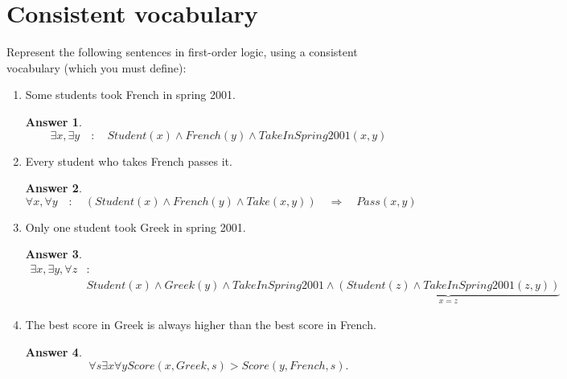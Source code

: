 \documentclass[a4paper]{article}
\renewcommand{\(}{\left(}
\renewcommand{\)}{\right)}
\theoremstyle{plain}
\theoremstyle{plain}
\theoremstyle{definition}
\newtheorem*{answer}{Answer}
\begin{document}
\section{Consistent vocabulary}
Represent the following sentences in first-order logic, using a consistent vocabulary (which you must define):
\begin{enumerate}[label*=\alph*.,ref=\alph*]
\item Some students took French in spring 2001.
\begin{shaded}
\begin{answer}
\begin{equation*}
  \exists x , \exists y \quad : \quad Student(x) \wedge French(y) \wedge TakeInSpring2001(x,y)
\end{equation*}
\end{answer}
\end{shaded}

\item Every student who takes French passes it.
\begin{shaded}
\begin{answer}
\begin{equation*}
  \forall x , \forall y \quad : \quad \left( Student(x) \wedge French(y) \wedge Take(x,y) \right) \quad \Rightarrow \quad Pass(x,y)
\end{equation*}
\end{answer}
\end{shaded}

\item Only one student took Greek in spring 2001.
\begin{shaded}
\begin{answer}
\begin{align*}
    \exists x , \exists y , \forall z &: \\
 & Student(x) \wedge Greek(y) \wedge TakeInSpring2001 \wedge \underbrace{(Student(z) \wedge TakeInSpring2001(z,y))}_{x = z}
\end{align*}
\end{answer}
\end{shaded}

\item The best score in Greek is always higher than the best score in French.
\begin{shaded}
\begin{answer}
\begin{equation*}
  \forall s \exists x \forall y Score(x,Greek, s) > Score(y,French, s).
\end{equation*}
\end{answer}
\end{shaded}


\end{enumerate}
\end{document}
